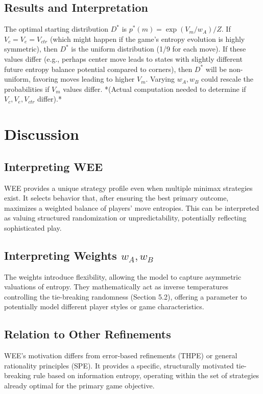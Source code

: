 \documentclass{article}
\begin{document}
\subsection{Results and Interpretation}
The optimal starting distribution $D^*$ is $p^*(m) = \exp(V_m / w_A) / Z$. If $V_c = V_e = V_{ctr}$ (which might happen if the game's entropy evolution is highly symmetric), then $D^*$ is the uniform distribution (1/9 for each move). If these values differ (e.g., perhaps center move leads to states with slightly different future entropy balance potential compared to corners), then $D^*$ will be non-uniform, favoring moves leading to higher $V_m$. Varying $w_A, w_B$ could rescale the probabilities if $V_m$ values differ. *(Actual computation needed to determine if $V_c, V_e, V_{ctr}$ differ).*

\section{Discussion}

\subsection{Interpreting WEE}
WEE provides a unique strategy profile even when multiple minimax strategies exist. It selects behavior that, after ensuring the best primary outcome, maximizes a weighted balance of players' move entropies. This can be interpreted as valuing structured randomization or unpredictability, potentially reflecting sophisticated play.

\subsection{Interpreting Weights \texorpdfstring{$w_A, w_B$}{wA, wB}}
The weights introduce flexibility, allowing the model to capture asymmetric valuations of entropy. They mathematically act as inverse temperatures controlling the tie-breaking randomness (Section 5.2), offering a parameter to potentially model different player styles or game characteristics.

\subsection{Relation to Other Refinements}
WEE's motivation differs from error-based refinements (THPE) or general rationality principles (SPE). It provides a specific, structurally motivated tie-breaking rule based on information entropy, operating within the set of strategies already optimal for the primary game objective.
\end{document}
